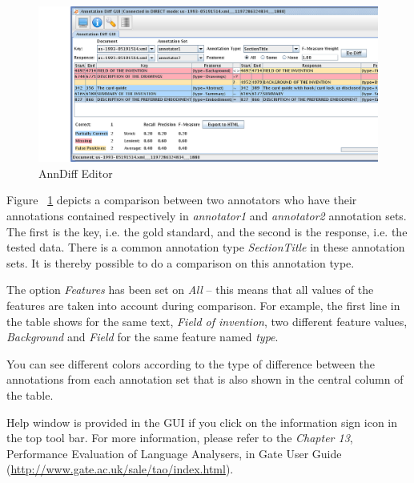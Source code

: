 \begin{figure}[hb!]
\centering
\includegraphics[scale=0.32]{anndiffgui}
\caption{AnnDiff Editor}
\label{fig:anndiffgui}
\end{figure}

Figure ~\ref{fig:anndiffgui} depicts a comparison
between two annotators who have their annotations contained respectively in
\emph{annotator1} and \emph{annotator2} annotation sets. The first is the key,
i.e. the gold standard, and the second is the response, i.e. the tested data.
There is a common annotation type \emph{SectionTitle} in these annotation sets.
It is thereby possible to do a comparison on this annotation type.

The option \emph{Features} has been set on \emph{All} -- this means that all
values of the
features are taken into account during comparison. For example, the first
line in the table shows for the same text, \emph{Field of invention}, two
different feature values, \emph{Background} and \emph{Field} for the same
feature named \emph{type}.

You can see different colors according to the type of difference between the
annotations from each annotation set that is also shown in the central column
of the table.

Help window is provided in the GUI if you click on the information sign icon
in the top tool bar. For more information, please refer to the \emph{Chapter 13},
Performance Evaluation of Language Analysers, in Gate User Guide
(\url{http://www.gate.ac.uk/sale/tao/index.html}).

